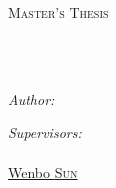 \documentclass[
11pt, %
english, %
singlespacing, %
parskip, %
headsepline, %
dvipsnames]{misc/MastersDoctoralThesis} %
\author{Pepijn te \textsc{Marvelde}} %
\theoremstyle{definition}
\begin{document}
\frontmatter %

\pagestyle{plain} %


\begin{titlepage}
    \begin{center}

        \vspace*{.06\textheight}
        {\scshape\LARGE \univname\par}\vspace{1.5cm} %
        \textsc{\Large Master’s Thesis}\\[0.5cm] %

        \HRule \\[0.4cm] %
        {\huge \bfseries \ttitle\par}\vspace{0.4cm} %
        \HRule \\[1.5cm] %

        \begin{minipage}[t]{0.4\textwidth}
            \begin{flushleft} \large
                \emph{Author:}\\
                \authorname %
            \end{flushleft}
        \end{minipage}
        \begin{minipage}[t]{0.4\textwidth}
            \begin{flushright} \large
                \emph{Supervisors:} \\
                \href{https://www.wis.ewi.tudelft.nl/hai}{\supname}\\ %
                \href{https://www.wis.ewi.tudelft.nl/sun}{Wenbo \textsc{Sun}}
            \end{flushright}
        \end{minipage}\\[3cm]

        \vfill


\end{center}
\end{titlepage}
\end{document}
